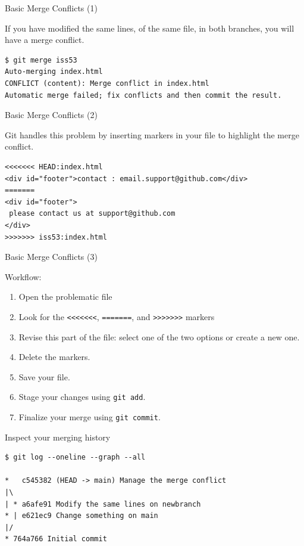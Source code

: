 \documentclass[handout]{beamer}
\begin{document}
\begin{frame}[fragile]{Basic Merge Conflicts (1)}

If you have modified the same lines, of the same file, in both branches, you will have a merge conflict. 

\begin{lstlisting}
$ git merge iss53
Auto-merging index.html
CONFLICT (content): Merge conflict in index.html
Automatic merge failed; fix conflicts and then commit the result.
\end{lstlisting}

\end{frame}

\begin{frame}[fragile]{Basic Merge Conflicts (2)}

Git handles this problem by inserting markers in your file to highlight the merge conflict.

\begin{lstlisting}
<<<<<<< HEAD:index.html
<div id="footer">contact : email.support@github.com</div>
=======
<div id="footer">
 please contact us at support@github.com
</div>
>>>>>>> iss53:index.html
\end{lstlisting}

\end{frame}

\begin{frame}{Basic Merge Conflicts (3)}

Workflow:
\begin{enumerate}
	\item Open the problematic file
	\item Look for the \texttt{<<<<<<<}, \texttt{=======}, and \texttt{>>>>>>>} markers
	\item Revise this part of the file: select one of the two options or create a new one.
	\item Delete the markers. 
	\item Save your file.
	\item Stage your changes using \texttt{git add}.
	\item Finalize your merge using \texttt{git commit}.
\end{enumerate}

\end{frame}

\begin{frame}[fragile]{Inspect your merging history}

\begin{lstlisting}
$ git log --oneline --graph --all

*   c545382 (HEAD -> main) Manage the merge conflict
|\  
| * a6afe91 Modify the same lines on newbranch
* | e621ec9 Change something on main
|/  
* 764a766 Initial commit
\end{lstlisting}

\end{frame}
\end{document}

